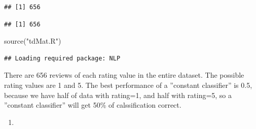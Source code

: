 \documentclass[
]{article}
\newenvironment{Shaded}{\begin{snugshade}}{\end{snugshade}}
\newcommand{\AttributeTok}[1]{\textcolor[rgb]{0.77,0.63,0.00}{#1}}
\newcommand{\CommentTok}[1]{\textcolor[rgb]{0.56,0.35,0.01}{\textit{#1}}}
\newcommand{\DecValTok}[1]{\textcolor[rgb]{0.00,0.00,0.81}{#1}}
\newcommand{\FloatTok}[1]{\textcolor[rgb]{0.00,0.00,0.81}{#1}}
\newcommand{\FunctionTok}[1]{\textcolor[rgb]{0.00,0.00,0.00}{#1}}
\newcommand{\NormalTok}[1]{#1}
\newcommand{\OtherTok}[1]{\textcolor[rgb]{0.56,0.35,0.01}{#1}}
\newcommand{\SpecialCharTok}[1]{\textcolor[rgb]{0.00,0.00,0.00}{#1}}
\newcommand{\StringTok}[1]{\textcolor[rgb]{0.31,0.60,0.02}{#1}}
\providecommand{\tightlist}{%
  \setlength{\itemsep}{0pt}\setlength{\parskip}{0pt}}
\begin{document}
\begin{verbatim}
## [1] 656
\end{verbatim}

\begin{Shaded}
\end{Shaded}

\begin{verbatim}
## [1] 656
\end{verbatim}

\begin{Shaded}
\begin{Highlighting}[]
\FunctionTok{source}\NormalTok{(}\StringTok{"tdMat.R"}\NormalTok{)}
\end{Highlighting}
\end{Shaded}

\begin{verbatim}
## Loading required package: NLP
\end{verbatim}

There are 656 reviews of each rating value in the entire dataset. The
possible rating values are 1 and 5. The best performance of a ''constant
classifier'' is 0.5, because we have half of data with rating=1, and
half with rating=5, so a ''constant classifier'' will get 50\% of
calssification correct.

\begin{enumerate}
\def\labelenumi{(\alph{enumi})}
\setcounter{enumi}{2}
\tightlist
\item
\end{enumerate}

\begin{Shaded}
\end{Shaded}
\end{document}
